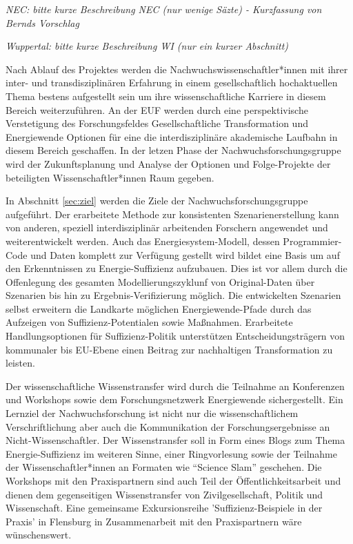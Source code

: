 \documentclass[a4paper,11pt,twoside]{scrartcl}
\begin{document}
\textit{NEC: bitte kurze Beschreibung NEC (nur wenige Säzte) - Kurzfassung von Bernds Vorschlag}

\textit{Wuppertal: bitte kurze Beschreibung WI (nur ein kurzer Abschnitt)}

Nach Ablauf des Projektes werden die Nachwuchswissenschaftler*innen mit ihrer inter- und transdisziplinären Erfahrung in einem gesellschaftlich hochaktuellen Thema bestens aufgestellt sein um ihre wissenschaftliche Karriere in diesem Bereich weiterzuführen. An der EUF werden durch eine perspektivische Verstetigung des Forschungsfeldes Gesellschaftliche Transformation und Energiewende Optionen für eine die interdisziplinäre akademische Laufbahn in diesem Bereich geschaffen. In der letzen Phase der Nachwuchsforschungsgruppe wird der Zukunftsplanung und Analyse der Optionen und Folge-Projekte der beteiligten Wissenschaftler*innen Raum gegeben. 


In Abschnitt \ref{sec:ziel} werden die Ziele der Nachwuchsforschungsgruppe aufgeführt. Der erarbeitete Methode zur konsistenten Szenarienerstellung kann von anderen, speziell interdisziplinär arbeitenden Forschern angewendet und weiterentwickelt werden. Auch das Energiesystem-Modell, dessen Programmier-Code und Daten komplett zur Verfügung gestellt wird bildet eine Basis um auf den Erkenntnissen zu Energie-Suffizienz aufzubauen. Dies ist vor allem durch die Offenlegung des gesamten Modellierungszyklunf von Original-Daten über Szenarien bis hin zu Ergebnis-Verifizierung möglich. Die entwickelten Szenarien selbst erweitern die Landkarte  möglichen Energiewende-Pfade durch das Aufzeigen von Suffizienz-Potentialen sowie Maßnahmen. Erarbeitete Handlungsoptionen für Suffizienz-Politik unterstützen Entscheidungsträgern von kommunaler bis EU-Ebene einen Beitrag zur nachhaltigen Transformation zu leisten.

Der wissenschaftliche Wissenstransfer wird durch die Teilnahme an Konferenzen und Workshops sowie dem Forschungsnetzwerk Energiewende sichergestellt. 
Ein Lernziel der Nachwuchsforschung ist nicht nur die wissenschaftlichem Verschriftlichung aber auch die Kommunikation der Forschungsergebnisse an Nicht-Wissenschaftler. Der Wissenstransfer soll in Form eines Blogs zum Thema Energie-Suffizienz im weiteren Sinne, einer Ringvorlesung sowie der Teilnahme der Wissenschaftler*innen an Formaten wie ``Science Slam'' geschehen. Die Workshops mit den Praxispartnern sind auch Teil der Öffentlichkeitsarbeit und dienen dem gegenseitigen Wissenstransfer von Zivilgesellschaft, Politik und Wissenschaft. Eine gemeinsame Exkursionsreihe 'Suffizienz-Beispiele in der Praxis' in Flensburg in Zusammenarbeit mit den Praxispartnern wäre wünschenswert.
\end{document}
